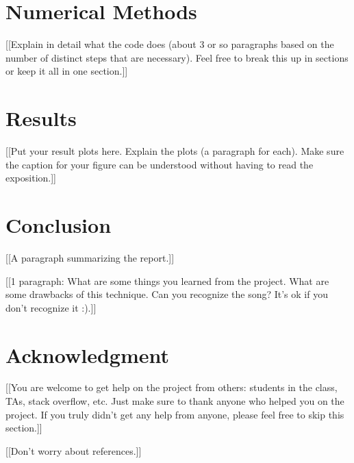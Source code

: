 \documentclass[12pt]{article}%
\begin{document}
\section{Numerical Methods}

{\color{red}[[Explain in detail what the code does (about 3 or so paragraphs based on the number of distinct steps that are necessary).   Feel free to break this up in sections or keep it all in one section.]]}


\section{Results}

{\color{red}[[Put your result plots here.  Explain the plots (a paragraph for each).  Make sure the caption for your figure can be understood without having to read the exposition.]]}


\section{Conclusion}\label{Sec: Conclusion}

{\color{red}[[A paragraph summarizing the report.]]}


{\color{red}[[1 paragraph:  What are some things you learned from the project.  What are some drawbacks of this technique.  {\color{blue} Can you recognize the song?  It's ok if you don't recognize it :).}]]}


\section*{Acknowledgment}

{\color{red}[[You are welcome to get help on the project from others:  students in the class, TAs, stack overflow, etc.  Just make sure to thank anyone who helped you on the project.  If you truly didn't get any help from anyone, please feel free to skip this section.]]}


\bigskip
\bigskip
\bigskip

{\color{red}[[Don't worry about references.]]}
\end{document}

